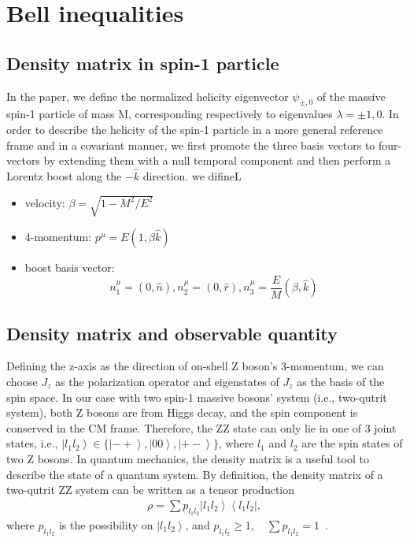 \documentclass{article}
\newcommand{\ket}[1]{\left|#1\right\rangle}
\newcommand{\bra}[1]{\left\langle#1\right|}
\begin{document}
\section{Bell inequalities}
\subsection{Density matrix in spin-1 particle}
In the paper\cite{fabbrichesi_bell_2023}, we define the normalized helicity eigenvector \(\psi_{\pm,0}\) of the massive spin-1 particle of mass M, corresponding respectively to eigenvalues \(\lambda=\pm1,0\). In order to describe the helicity of the spin-1 particle in a more general reference frame and in a covariant manner, we first promote the three basis vectors to four-vectors by extending them with a null temporal component and then perform a Lorentz boost along the \(-\hat{k}\) direction. we difineL
\begin{itemize}
    \item velocity: \(\beta=\sqrt{1-M^2/E^2}\)
    \item 4-momentum: \(p^\mu=E(1,\beta \hat{k})\)
    \item boost basis vector:
        \[n_1^\mu=(0,\hat{n}),n_2^\mu=(0,\hat{r}), n_3^\mu=\frac{E}{M}(\beta,\hat{k})\]
\end{itemize}
\subsection{Density matrix and observable quantity}
Defining the z-axis as the direction of on-shell Z boson's 3-momentum, we can choose \(J_z\) as the polarization operator and eigenstates of \(J_z\) as the basis of the spin space. In our case with two spin-1 massive bosons' system (i.e., two-qutrit system), both Z bosons are from Higgs decay, and the spin component is conserved in the CM frame. Therefore, the ZZ state can only lie in one of 3 joint states, i.e., \({\ket{l_1l_2}\in\{\ket{-+}, \ket{00}, \ket{+-}}\}\), where \(l_1\) and \(l_2\) are the spin states of two Z bosons. In quantum mechanics, the density matrix is a useful tool to describe the state of a quantum system. By definition, the density matrix of a two-qutrit ZZ system can be written as a tensor production
\begin{align}
    \rho=\sum p_{l_1l_2}\ket{l_1l_2}\bra{l_1l_2},
\end{align} 
where \(p_{l_1l_2}\) is the possibility on \(\ket{l_1l_2}\), and \(p_{l_1l_2}\geq1,\quad\sum p_{l_1l_2}=1\)~\cite{Aguilar-Saavedra:2022wam}.   
 
\end{document}
